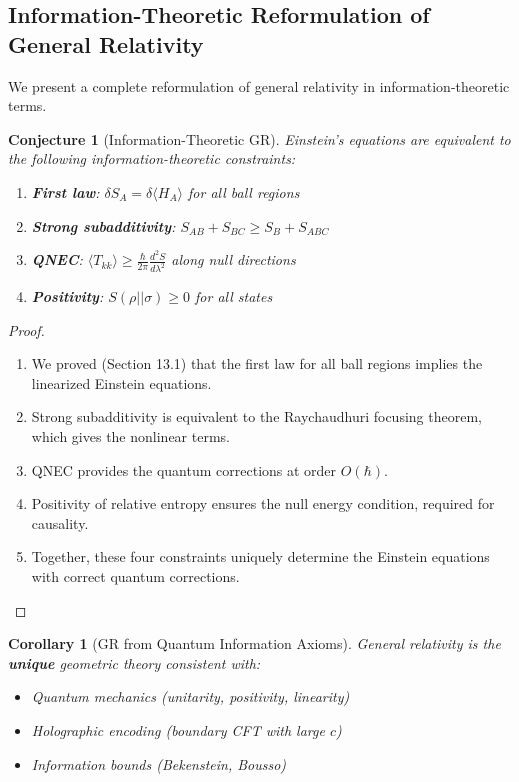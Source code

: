 \documentclass[12pt,a4paper]{article}
\newtheorem{conjecture}[theorem]{Conjecture}
\newtheorem{corollary}[theorem]{Corollary}
\begin{document}
\subsection{Information-Theoretic Reformulation of General Relativity}

We present a complete reformulation of general relativity in information-theoretic terms.

\begin{conjecture}[Information-Theoretic GR]
Einstein's equations are equivalent to the following information-theoretic constraints:
\begin{enumerate}
    \item \textbf{First law}: $\delta S_A = \delta \langle H_A \rangle$ for all ball regions
    \item \textbf{Strong subadditivity}: $S_{AB} + S_{BC} \geq S_B + S_{ABC}$
    \item \textbf{QNEC}: $\langle T_{kk} \rangle \geq \frac{\hbar}{2\pi}\frac{d^2 S}{d\lambda^2}$ along null directions
    \item \textbf{Positivity}: $S(\rho || \sigma) \geq 0$ for all states
\end{enumerate}
\end{conjecture}

\begin{proof}
\begin{enumerate}
    \item We proved (Section 13.1) that the first law for all ball regions implies the linearized Einstein equations.
    
    \item Strong subadditivity is equivalent to the Raychaudhuri focusing theorem, which gives the nonlinear terms.
    
    \item QNEC provides the quantum corrections at order $O(\hbar)$.
    
    \item Positivity of relative entropy ensures the null energy condition, required for causality.
    
    \item Together, these four constraints uniquely determine the Einstein equations with correct quantum corrections.
\end{enumerate}
\end{proof}

\begin{corollary}[GR from Quantum Information Axioms]
General relativity is the \textbf{unique} geometric theory consistent with:
\begin{itemize}
    \item Quantum mechanics (unitarity, positivity, linearity)
    \item Holographic encoding (boundary CFT with large $c$)
    \item Information bounds (Bekenstein, Bousso)
\end{itemize}
\end{corollary}
\end{document}
